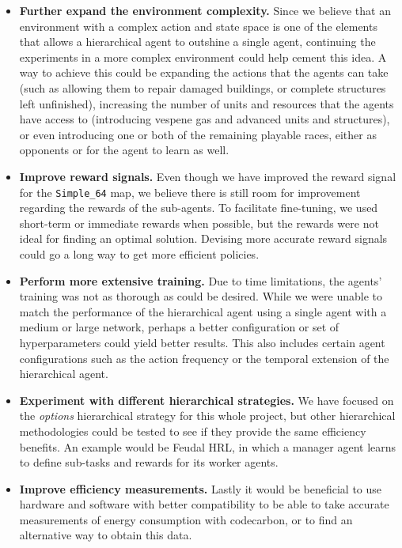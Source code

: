 \begin{itemize}
    \item \textbf{Further expand the environment complexity.} Since we believe that an environment with a complex action and state space is one of the elements that allows a hierarchical agent to outshine a single agent, continuing the experiments in a more complex environment could help cement this idea. A way to achieve this could be expanding the actions that the agents can take (such as allowing them to repair damaged buildings, or complete structures left unfinished), increasing the number of units and resources that the agents have access to (introducing vespene gas and advanced units and structures), or even introducing one or both of the remaining playable races, either as opponents or for the agent to learn as well.
    \item \textbf{Improve reward signals.} Even though we have improved the reward signal for the \texttt{Simple\_64} map, we believe there is still room for improvement regarding the rewards of the sub-agents. To facilitate fine-tuning, we used short-term or immediate rewards when possible, but the rewards were not ideal for finding an optimal solution. Devising more accurate reward signals could go a long way to get more efficient policies.
    \item \textbf{Perform more extensive training.} Due to time limitations, the agents' training was not as thorough as could be desired. While we were unable to match the performance of the hierarchical agent using a single agent with a medium or large network, perhaps a better configuration or set of hyperparameters could yield better results. This also includes certain agent configurations such as the action frequency or the temporal extension of the hierarchical agent.
    \item \textbf{Experiment with different hierarchical strategies.} We have focused on the \textit{options} hierarchical strategy for this whole project, but other hierarchical methodologies could be tested to see if they provide the same efficiency benefits. An example would be Feudal HRL, in which a manager agent learns to define sub-tasks and rewards for its worker agents.
    \item \textbf{Improve efficiency measurements.} Lastly it would be beneficial to use hardware and software with better compatibility to be able to take accurate measurements of energy consumption with codecarbon, or to find an alternative way to obtain this data.
\end{itemize}